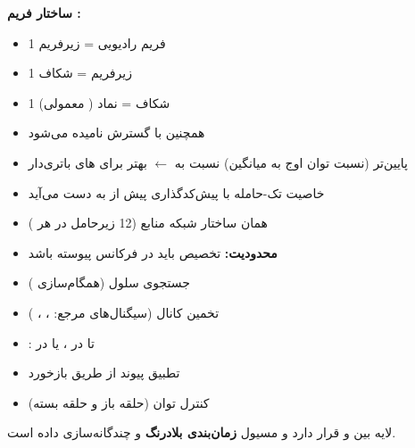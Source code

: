 \textbf{ساختار فریم :}

\begin{itemize}
\tightlist
\item
  1 فریم رادیویی =  زیرفریم
\item
  1 زیرفریم =  شکاف
\item
  1 شکاف =  نماد  ( معمولی)
\end{itemize}


\begin{itemize}
\tightlist
\item
  همچنین  با گسترش  نامیده می‌شود 
\item
   پایین‌تر (نسبت توان اوج به میانگین) نسبت به  \ensuremath{\leftarrow} بهتر برای های باتری‌دار
\item
  خاصیت تک-حامله با پیش‌کدگذاری  پیش از  به دست می‌آید
\item
  همان ساختار شبکه منابع  (12 زیرحامل در هر )
\item
  \textbf{محدودیت:} تخصیص  باید در فرکانس پیوسته باشد
\end{itemize}


\begin{itemize}
\tightlist
\item
  جستجوی سلول (همگام‌سازی )
\item
  تخمین کانال (سیگنال‌های مرجع: ، ، )
\item
  : تا  در ،  یا  در 
\item
  تطبیق پیوند از طریق بازخورد 
\item
  کنترل توان (حلقه باز و حلقه بسته)
\end{itemize}


لایه  بین  و  قرار دارد و مسیول \textbf{زمان‌بندی بلادرنگ} و چندگانه‌سازی داده است.

